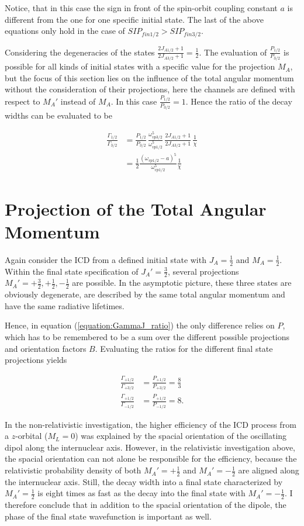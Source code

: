 Notice, that in this case the sign in front of the spin-orbit coupling
constant $a$ is different from the one for one specific initial state.
The last of the above equations only hold in the case of
$SIP_{fin1/2} > SIP_{fin3/2}$.

Considering the degeneracies of the states
$\frac{2J_{A1/2}+1}{2J_{A3/2}+1} = \frac 12$.
The evaluation of $\frac{P_{1/2}}{P_{3/2}}$ is possible for all kinds
of initial states with a specific value for the projection $M_A$, but
the focus of this section lies on the influence of the total
angular momentum without the consideration of their projections, here
the channels are defined with respect to $M_A'$ instead of
$M_A$. In this case $\frac{P_{1/2}}{P_{3/2}} = 1$.
Hence the ratio of the decay widths can be evaluated to be

\begin{align}
  \frac{\Gamma_{1/2}}{\Gamma_{3/2}}
  &= \frac{P_{1/2}}{P_{3/2}}
     \,\frac{\omega_{vp3/2}^5}{\omega_{vp1/2}^5}
     \,\frac{2J_{A1/2}+1}{2J_{A3/2}+1} \, \frac{1}{\chi}\\
  &= \frac 12 \frac{(\omega_{vp1/2} -a)^5}{\omega_{vp1/2}^5} \frac{1}{\chi}
\end{align}


\section{Projection of the Total Angular Momentum}
Again consider the ICD from a defined initial state with $J_A=\frac 12$ and
$M_A=\frac 12$. Within the final state specification of $J_A'=\frac 32$, several
projections $M_A'= +\frac 32, +\frac 12, -\frac 12$ are possible. In the asymptotic
picture, these three states are obviously degenerate, are described by the same
total angular momentum and have the same radiative lifetimes.

Hence, in equation (\ref{equation:GammaJ_ratio}) the only difference relies on $P$,
which has to be remembered to be a sum over the different possible projections
and orientation factors $B$. Evaluating the ratios for the different final state
projections yields

\begin{align}
  \frac{\Gamma_{+1/2}}{\Gamma_{+3/2}} &= \frac{P_{+1/2}}{P_{+3/2}} = \frac 83  \\
  \frac{\Gamma_{+1/2}}{\Gamma_{-1/2}} &= \frac{P_{+1/2}}{P_{-1/2}} = 8   .
\end{align}

In the non-relativistic investigation, the higher efficiency of the \ac{ICD} process
from a $z$-orbital ($M_L=0$) was explained by the spacial orientation of the
oscillating dipol along the internuclear axis.
However, in the relativistic investigation above, the spacial orientation
can not alone be responsible for the efficiency, because the relativistic
probability density of both $M_A'= +\frac 12$ and $M_A'= -\frac 12$ are aligned
along the internuclear axis. Still, the decay width into a final state characterized
by $M_A'= \frac 12$ is eight times as fast as the decay into the final state
with $M_A'= -\frac 12$. I therefore conclude that in addition to the spacial
orientation of the dipole, the phase of the final state wavefunction is
important as well.


